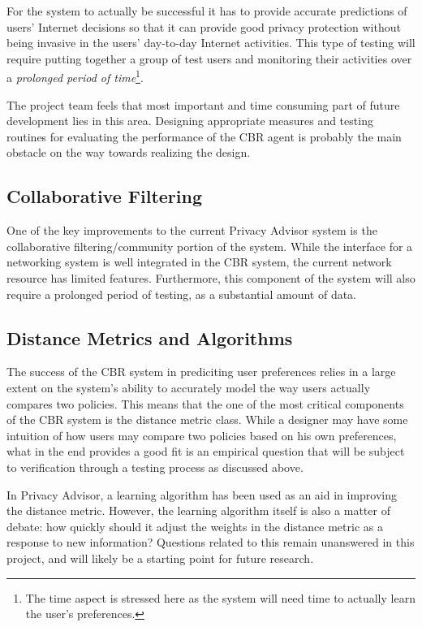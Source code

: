 For the system to actually be successful it has to provide accurate predictions
of users' Internet decisions so that it can provide good privacy protection
without being invasive in the users' day-to-day Internet activities. This type
of testing will require putting together a group of test users and monitoring their
activities over a \emph{prolonged period of time}\footnote{The time aspect is stressed here
as the system will need time to actually learn the user's preferences.}. 

The project team feels that most important and time consuming part of future development lies
in this area. Designing appropriate measures and testing routines for evaluating the performance
of the CBR agent is probably the main obstacle on the way towards realizing the design.

\subsection{Collaborative Filtering} %
One of the key improvements to the current Privacy Advisor system is the
collaborative filtering/community portion of the system. While the interface
for a networking system is well integrated in the CBR system, the current 
network resource has limited features. Furthermore, this component of the system
will also require a prolonged period of testing, as a substantial amount of data.


\subsection{Distance Metrics and Algorithms}
The success of the CBR system in prediciting user preferences relies
in a large extent on the system's ability to accurately model the way
users actually compares two policies. This means that the one of the
most critical components of the CBR system is the distance metric
class. While a designer may have some intuition of how users may
compare two policies based on his own preferences, what in the end
provides a good fit  is an empirical question that will be subject to
verification through a testing process as discussed above.

In Privacy Advisor, a learning algorithm has been used as an aid in
improving the distance metric. However, the learning algorithm itself
is also a matter of debate: how quickly should it adjust the weights
in the distance metric as a response to new information? Questions
related to this remain unanswered in this project, and will likely be
a starting point for future research.


